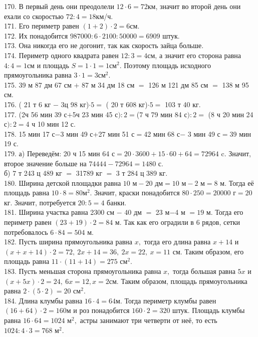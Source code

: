 \documentclass[12pt]{article}
\begin{document}
170. В первый день они преодолели $12\cdot6=72$км, значит во второй день они ехали со скоростью $72:4=18$км/ч.\\
171. Его периметр равен $(1+2)\cdot2=6$см.\\
172. Их понадобится $987000:6\cdot2100:50000=6909$ штук.\\
173. Она никогда его не догонит, так как скорость зайца больше.\\
174. Периметр одного квадрата равен $12:3=4$см, а значит его сторона равна $4:4=1$см и площадь $S=1\cdot1=1\text{см}^2.$ Поэтому площадь исходного прямоугольника равна $3\cdot1=3\text{см}^2.$\\
175. 39 м 87 дм 67 см $+$ 87 м 34 дм 18 см $=$ 126 м 121 дм 85 см $=$ 138 м 95 см.\\
176. ( 21 т 6 кг $-$ 3ц 98 кг)$\cdot5=$ ( 20 т 608 кг)$\cdot5=$ 103 т 40 кг.\\
177. (2ч 56 мин 39 с$+$5ч 23 мин 45 с$):2=$(7 ч 79 мин 84 с$):2=$ (8 ч 20 мин 24 с$):2=$4 ч 10 мин 12 с.\\
178. 15 мин 17 с$-$3 мин 49 с+27 мин 51 с$=$42 мин 68 с$-$ 3 мин 49 с$=$39 мин 19 с.\\
179. а) Переведём: 20 ч 15 мин 64 с$=20\cdot3600+15\cdot60+64=72964$ c. Значит, второе значение больше на $74444-72964=1480$ с.\\
б) 7 т 243 ц 489 кг $=$ 31789 кг $=$ 3 т 284 ц 389 кг.\\
180. Ширина детской площадки равна $10\text{ м}-20 \text{ дм}=10\text{ м}-2\text{ м}=8\text{ м}.$ Тогда её площадь равна $10\cdot8=80\text{м}^2.$ Значит, краски понадобится $80\cdot250=20000\text{ г}=20$кг. Значит, потребуется $20:5=4$ банки.\\
181. Ширина участка равна 2300 см $-$ 40 дм $=$ 23 м$-$4 м $=19$ м. Тогда его периметр равен $(23+19)\cdot2=84$ м. Так как его оградили в 6 рядов, сетки потребовалось $6\cdot84=504$ м.\\
182. Пусть ширина прямоугольника равна $x,$ тогда его длина равна $x+14$ и $(x+x+14)\cdot2=72,\ 2x+14=36,\ 2x=22,\ x=11$ см. Таким образом, его площадь равна $11\cdot(11+14)=275\text{ см}^2.$\\
183. Пусть меньшая сторона прямоугольника равна $x,$ тогда большая равна $5x$ и $(x+5x)\cdot2=24,\ 6x=12, x=2$см. Таким образом, площадь прямоугольника равна $2\cdot(5\cdot2)=20\text{ см}^2.$\\
184. Длина клумбы равна $16\cdot4=64$м. Тогда периметр клумбы равен $(16+64)\cdot2=160$м и роз понадобится $160\cdot2=320$ штук. Площадь клумбы равна $16\cdot64=1024\text{ м}^2,$ астры занимают три четверти от неё, то есть $1024:4\cdot3=768\text{ м}^2.$\\
\end{document}
